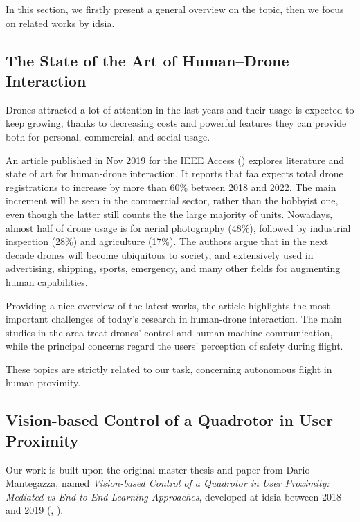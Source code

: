 In this section, we firstly present a general overview on the topic, then we focus on related works by \gls{idsia}.



\subsection{The State of the Art of Human–Drone Interaction}
\label{subsec:human-drone-sota}

Drones attracted a lot of attention in the last years and their usage is expected to keep growing, thanks to decreasing costs and powerful features they can provide both for personal, commercial, and social usage.

An article published in Nov 2019 for the IEEE Access (\cite{human-drone-sota}) explores literature and state of art for human-drone interaction. It reports that \gls{faa} expects total drone registrations to increase by more than 60\% between 2018 and 2022. The main increment will be seen in the commercial sector, rather than the hobbyist one, even though the latter still counts the the large majority of units. Nowadays, almost half of drone usage is for aerial photography (48\%), followed by industrial inspection (28\%) and agriculture (17\%). The authors argue that in the next decade drones will become ubiquitous to society, and extensively used in advertising, shipping, sports, emergency, and many other fields for augmenting human capabilities.

Providing a nice overview of the latest works, the article highlights the most important challenges of today's research in human-drone interaction. The main studies in the area treat drones' control and human-machine communication, while the principal concerns regard the users' perception of safety during flight.

These topics are strictly related to our task, concerning autonomous flight in human proximity.



\subsection{Vision-based Control of a Quadrotor in User Proximity}
\label{subsec:sota-dario}

Our work is built upon the original master thesis and paper from Dario Mantegazza, named \textit{Vision-based Control of a Quadrotor in User Proximity: Mediated vs End-to-End Learning Approaches}, developed at \gls{idsia} between 2018 and 2019 (\cite{mantegazza2018thesis}, \cite{mantegazza2019visionbased}).

